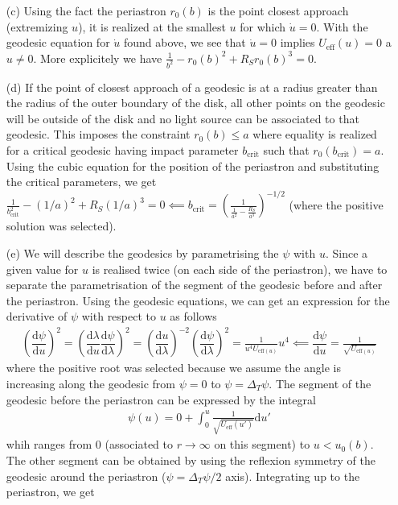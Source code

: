 \documentclass[10pt, a4paper]{article}
\begin{document}
\begin{enumerate}
  \newpage
  \item[(c)] Using the fact the periastron $r_0(b)$ is the point closest approach (extremizing $u$), it is realized at the smallest $u$ for which $\dot{u} = 0$. With the geodesic equation for $\dot{u}$ found above, we see that $\dot{u} = 0$ implies $U_{\text{eff}}(u) = 0$ a $u \neq 0$. More explicitely we have $\frac{1}{b^2}-r_0(b)^2+R_S r_0(b)^3 = 0$. 
  \item[(d)] If the point of closest approach of a geodesic is at a radius greater than the radius of the outer boundary of the disk, all other points on the geodesic will be outside of the disk and no light source can be associated to that geodesic. This imposes the constraint $r_0(b) \leq a$ where equality is realized for a critical geodesic having impact parameter $b_{\text{crit}}$ such that $r_0(b_{\text{crit}}) = a$. Using the cubic equation for the position of the periastron and substituting the critical parameters, we get $\frac{1}{b_{\text{crit}}^2}-(1/a)^2+R_S (1/a)^3 = 0 \impliedby b_{\text{crit}} = \left(\frac{1}{\frac{1}{a^2}-\frac{R_S}{a^3}}\right)^{-1/2}$ (where the positive solution was selected). 
  \item[(e)] We will describe the geodesics by parametrising the $\psi$ with $u$. Since a given value for $u$ is realised twice (on each side of the periastron), we have to separate the parametrisation of the segment of the geodesic before and after the periastron. Using the geodesic equations, we can get an expression for the derivative of $\psi$ with respect to $u$ as follows 
  \begin{align*}
    \left(\dfrac{\text{d}\psi}{\text{d}u}\right)^2 = \left(\dfrac{\text{d}\lambda}{\text{d}u}\dfrac{\text{d}\psi}{\text{d}\lambda}\right)^2 =  \left(\dfrac{\text{d}u}{\text{d}\lambda}\right)^{-2} \left(\dfrac{\text{d}\psi}{\text{d}\lambda}\right)^2 = \frac{1}{u^4 U_{\text{eff}(u)}} u^4 \impliedby \dfrac{\text{d}\psi}{\text{d}u} = \frac{1}{\sqrt{U_{\text{eff}(u)}}}
  \end{align*} 
  where the positive root was selected because we assume the angle is increasing along the geodesic from $\psi = 0$ to $\psi = \Delta_T \psi$. The segment of the geodesic before the periastron can be expressed by the integral
  \begin{align*}
    \psi(u) = 0+\int_{0}^{u} \frac{1}{\sqrt{U_{\text{eff}}(u')}}\text{d}u'
  \end{align*}
  whih ranges from $0$ (associated to $r\to \infty$ on this segment) to $u<u_0(b)$. The other segment can be obtained by using the reflexion symmetry of the geodesic around the periastron ($\psi = \Delta_T \psi/2$ axis). Integrating up to the periastron, we get 

\end{enumerate}
\end{document}
